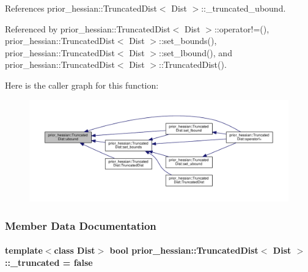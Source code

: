 References prior\+\_\+hessian\+::\+Truncated\+Dist$<$ Dist $>$\+::\+\_\+truncated\+\_\+ubound.



Referenced by prior\+\_\+hessian\+::\+Truncated\+Dist$<$ Dist $>$\+::operator!=(), prior\+\_\+hessian\+::\+Truncated\+Dist$<$ Dist $>$\+::set\+\_\+bounds(), prior\+\_\+hessian\+::\+Truncated\+Dist$<$ Dist $>$\+::set\+\_\+lbound(), and prior\+\_\+hessian\+::\+Truncated\+Dist$<$ Dist $>$\+::\+Truncated\+Dist().



Here is the caller graph for this function\+:\nopagebreak
\begin{figure}[H]
\begin{center}
\leavevmode
\includegraphics[width=350pt]{classprior__hessian_1_1TruncatedDist_a46cba73068eff4d100e8184deebb8016_icgraph}
\end{center}
\end{figure}




\subsubsection{Member Data Documentation}
\paragraph[{\texorpdfstring{\+\_\+truncated}{_truncated}}]{\setlength{\rightskip}{0pt plus 5cm}template$<$class Dist$>$ bool {\bf prior\+\_\+hessian\+::\+Truncated\+Dist}$<$ Dist $>$\+::\+\_\+truncated = false\hspace{0.3cm}{\ttfamily [protected]}}\hypertarget{classprior__hessian_1_1TruncatedDist_aca705570da7ead8a28ff37171fdb5d6e}{}\label{classprior__hessian_1_1TruncatedDist_aca705570da7ead8a28ff37171fdb5d6e}


